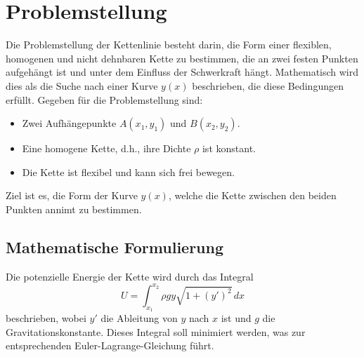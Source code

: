 %
%
%
%
\section{Problemstellung\label{kettenlinie:section:Problemstellung}}
Die Problemstellung der Kettenlinie besteht darin, die Form einer flexiblen, homogenen und nicht dehnbaren Kette zu bestimmen, die an zwei festen Punkten aufgehängt ist und unter dem Einfluss der Schwerkraft hängt.
Mathematisch wird dies als die Suche nach einer Kurve \( y(x) \) beschrieben, die diese Bedingungen erfüllt.
Gegeben für die Problemstellung sind: 
\begin{itemize}
\item
Zwei Aufhängepunkte \( A(x_1, y_1) \) und \( B(x_2, y_2) \).
\item
Eine homogene Kette, d.h., ihre Dichte \( \rho \) ist konstant.
\item
Die Kette ist flexibel und kann sich frei bewegen.
\end{itemize}
Ziel ist es, die Form der Kurve \( y(x) \), welche die Kette zwischen den beiden Punkten annimt zu bestimmen.

\subsection{Mathematische Formulierung
\label{kettenlinie:subsection:Mathematische Formulierung}}
Die potenzielle Energie der Kette wird durch das Integral
\begin{equation}
	U = \int_{x_1}^{x_2} \rho g y \sqrt{1 + (y')^2} \, dx
\end{equation}
beschrieben, wobei \( y' \) die Ableitung von \( y \) nach \( x \) ist und \( g \) die Gravitationskonstante.
Dieses Integral soll minimiert werden, was zur entsprechenden Euler-Lagrange-Gleichung führt.


